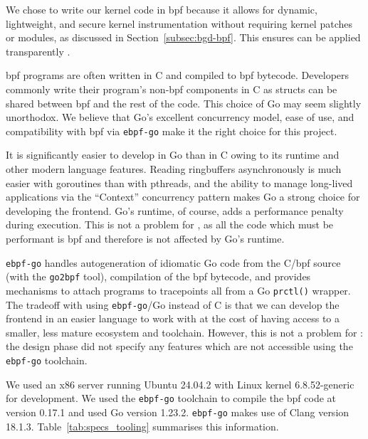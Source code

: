 We chose to write our kernel code in \ac{bpf} because it allows for dynamic,
lightweight, and secure kernel instrumentation without requiring kernel patches
or modules, as discussed in Section~\ref{subsec:bgd-bpf}. This ensures \af can
be applied transparently \cite{halinen-security-risks-sidecar-containers-2024}.

\ac{bpf} programs are often written in C and compiled to \ac{bpf} bytecode.
Developers commonly write their program's non-\ac{bpf} components 
in C as structs can be shared between \ac{bpf} and the rest of the code.
This choice of Go may seem slightly unorthodox. We believe that Go's
excellent concurrency model, ease of use, and compatibility with \ac{bpf} via
\texttt{ebpf-go} make it the right choice for this project. 

It is significantly easier to develop in Go than in C owing to its runtime and other 
modern language features. Reading ringbuffers asynchronously is much easier with 
goroutines than with pthreads, and the ability to manage long-lived applications 
via the  ``Context'' concurrency pattern makes Go a strong choice for developing the 
frontend. Go's runtime, of course, adds a performance penalty during execution. This  is not a problem for \afss, as all the code which must be performant is \ac{bpf} 
and therefore is not affected by Go's runtime. 

\texttt{ebpf-go} handles autogeneration of idiomatic Go code from the C/\ac{bpf}
source (with the \texttt{go2bpf} tool),
compilation of the \ac{bpf} bytecode, and provides mechanisms to attach programs
to tracepoints all from a Go \texttt{prctl()} wrapper. The tradeoff with using
\texttt{ebpf-go}/Go instead of C is that we can develop the frontend in an
easier language to work with at the cost of having access to a smaller, less
mature ecosystem and toolchain. However, this is not a problem for \afss: the
design phase did not specify any features which are not accessible using the
\texttt{ebpf-go} toolchain. 

We used an x86 server running Ubuntu 24.04.2 with Linux
kernel 6.8.52-generic for development. We used the \texttt{ebpf-go} toolchain to compile the
\ac{bpf} code at version 0.17.1 and used Go version 1.23.2. \texttt{ebpf-go} makes use of
Clang version 18.1.3.
Table~\ref{tab:specs_tooling} summarises this information.

